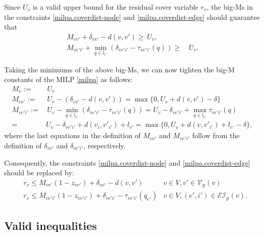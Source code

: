 \documentclass[review]{elsarticle}
\newcommand{\cEI}{{\mathcal {EI}}}
\newcommand{\cV}{{\mathcal V}}
\newcommand{\dlt}{{\delta}}
\theoremstyle{definition}
\begin{document}
Since $U_v$ is a valid upper bound for the residual cover variable $r_v$, the big-Ms in the constraints \eqref{milpa.coverdist-node} and \eqref{milpa.coverdist-edge} should guarantee that
\begin{equation*}
\begin{split}
	M_{vv'}+ \dlt_{vv'} - d(v,v') \ge\, U_v,\\
  M_{ve'i'}+ \min_{q \in l_{e'}}(\dlt_{ve'i'}-\tau_{ve'i'}(q)) \ge &\, U_v.
\end{split}
\end{equation*}

Taking the minimums of the above big-Ms, we can now tighten the big-M constants of the MILP \eqref{milpa} as follows:
\begin{equation}
\begin{split}
	M_{v}:=&\, U_v \\
	M_{vv'}:= &\, U_v - (\dlt_{vv'} - d(v,v')) = \max \{0, U_v+d(v,v')-\dlt\}\\
  M_{ve'i'}:= &\, U_v - \min_{q \in l_{e'}}(\dlt_{ve'i'}-\tau_{ve'i'}(q))
   = U_v - \dlt_{ve'i'} + \max_{q \in l_{e'}} \tau_{ve'i'}(q) \\
  =& U_v - \dlt_{ve'i'} + d(v_i,v'_{i'})+l_{e'}
  =  \max \{0, U_v+d(v,v'_{i'})+l_{e'}-\dlt\}, \nonumber
\end{split}
\end{equation}
where the last equations in the definition of $M_{vv'}$ and $M_{ve'i'}$ follow from the definition of $\dlt_{vv'}$ and $\dlt_{ve'i'}$, respectively.


Consequently, the constraints \eqref{milpa.coverdist-node} and \eqref{milpa.coverdist-edge}  should be replaced by:
\begin{subequations}
	\begin{align}
    	&   r_{v} \le M_{vv'}(1 - z_{vv'})  +  \dlt_{vv'} - d(v,v') & v \in V ,  v' \in \cV_{\mathrm{p}}(v) \label{milpa.coverdist-node_ref} \\
 &   r_{v} \le M_{ve'i'}(1 - z_{ve'{i'}})  +  \dlt_{ve'i'} - \tau_{ve'i'}(q_{e'}) & v \in V ,  (e',i') \in \cEI_{\mathrm{p}}(v). \label{milpa.coverdist-edge_ref}
	\end{align}
\end{subequations}

\subsection{Valid inequalities}\label{sec:valid-ineq}
\end{document}
